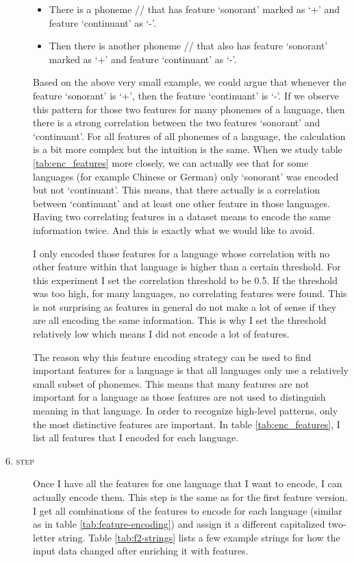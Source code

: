 \begin{description}
    \begin{itemize}
        \item There is a phoneme // that has feature `sonorant' marked as `+' and feature `continuant' as `-'.
        \item Then there is another phoneme // that also has feature `sonorant' marked as `+' and feature `continuant' as `-'.
    \end{itemize}
    Based on the above very small example, we could argue that whenever the feature `sonorant' is `+', then the feature `continuant' is `-'. If we observe this pattern for those two features for many phonemes of a language, then there is a strong correlation between the two features `sonorant' and `continuant'. For all features of all phonemes of a language, the calculation is a bit more complex but the intuition is the same. When we study table \ref{tab:enc_features} more closely, we can actually see that for some languages (for example Chinese or German) only `sonorant' was encoded but not `continuant'. This means, that there actually is a correlation between `continuant' and at least one other feature in those languages. Having two correlating features in a dataset means to encode the same information twice. And this is exactly what we would like to avoid.
    
    I only encoded those features for a language whose correlation with no other feature within that language is higher than a certain threshold. For this experiment I set the correlation threshold to be 0.5. If the threshold was too high, for many languages, no correlating features were found. This is not surprising as features in general do not make a lot of sense if they are all encoding the same information. This is why I set the threshold relatively low which means I did not encode a lot of features. 
    
    The reason why this feature encoding strategy can be used to find important features for a language is that all languages only use a relatively small subset of phonemes. This means that many features are not important for a language as those features are not used to distinguish meaning in that language. In order to recognize high-level patterns, only the most distinctive features are important. In table \ref{tab:enc_features}, I list all features that I encoded for each language.
    
    \item[\textsc{6. step}] Once I have all the features for one language that I want to encode, I can actually encode them. This step is the same as for the first feature version. I get all combinations of the features to encode for each language (similar as in table \ref{tab:feature-encoding}) and assign it a different capitalized two-letter string. Table \ref{tab:f2-strings} lists a few example strings for how the input data changed after enriching it with features.  
\end{description}

